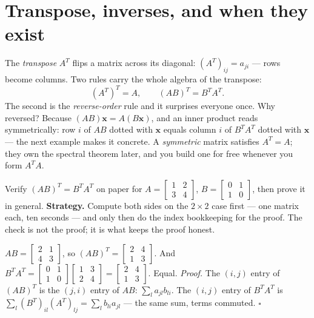 \section{Transpose, inverses, and when they exist}\label{sec:transposeinv}

The \emph{transpose} $A^{T}$ flips a matrix across its diagonal: $(A^{T})_{ij}=a_{ji}$ — rows become columns. Two rules carry the whole algebra of the transpose:
\[
  (A^{T})^{T}=A, \qquad (AB)^{T}=B^{T}A^{T}.
\]
The second is the \emph{reverse-order} rule and it surprises everyone once. Why reversed? Because $(AB)\mathbf{x}=A(B\mathbf{x})$, and an inner product reads symmetrically: row $i$ of $AB$ dotted with $\mathbf{x}$ equals column $i$ of $B^{T}A^{T}$ dotted with $\mathbf{x}$ — the next example makes it concrete. A \emph{symmetric} matrix satisfies $A^{T}=A$; they own the spectral theorem later, and you build one for free whenever you form $A^{T}A$.

\begin{example}\label{ex:transp}
Verify $(AB)^{T}=B^{T}A^{T}$ on paper for $A=\begin{bmatrix}1&2\\3&4\end{bmatrix}$, $B=\begin{bmatrix}0&1\\1&0\end{bmatrix}$, then prove it in general.
\textbf{Strategy.} Compute both sides on the $2\times2$ case first — one matrix each, ten seconds — and only then do the index bookkeeping for the proof. The check is not the proof; it is what keeps the proof honest.
\begin{solution}
$AB=\begin{bmatrix}2&1\\4&3\end{bmatrix}$, so $(AB)^{T}=\begin{bmatrix}2&4\\1&3\end{bmatrix}$. And $B^{T}A^{T}=\begin{bmatrix}0&1\\1&0\end{bmatrix}\begin{bmatrix}1&3\\2&4\end{bmatrix}=\begin{bmatrix}2&4\\1&3\end{bmatrix}$. Equal. \checkmark
\emph{Proof.} The $(i,j)$ entry of $(AB)^{T}$ is the $(j,i)$ entry of $AB$: $\sum_l a_{jl}b_{li}$. The $(i,j)$ entry of $B^{T}A^{T}$ is $\sum_l (B^{T})_{il}(A^{T})_{lj}=\sum_l b_{li}a_{jl}$ — the same sum, terms commuted. $\square$
\end{solution}
\end{example}

